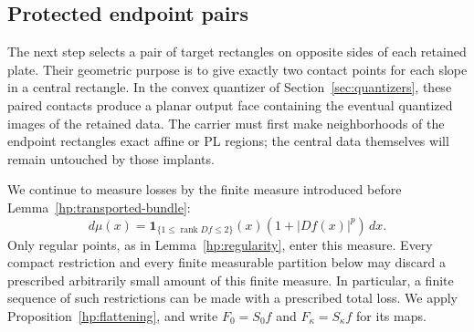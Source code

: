 \documentclass[11pt]{article}
\numberwithin{equation}{section}
\theoremstyle{definition}
\theoremstyle{remark}
\newcommand{\ind}{\mathbf 1}
\DeclareMathOperator{\rank}{rank}
\begin{document}
\subsection{Protected endpoint pairs}

The next step selects a pair of target rectangles on opposite sides of
each retained plate.  Their geometric purpose is to give exactly two
contact points for each slope in a central rectangle.  In the convex
quantizer of Section~\ref{sec:quantizers}, these paired contacts produce
a planar output face containing the eventual quantized images of the
retained data.  The carrier must
first make neighborhoods of the endpoint rectangles exact affine or
PL regions; the central data themselves will remain untouched by those
implants.

We continue to measure losses by the finite measure introduced before
Lemma~\ref{hp:transported-bundle}:
\[
 d\mu(x)=\ind_{\{1\leq\rank Df\leq2\}}(x)
             (1+|Df(x)|^p)\,dx.
\]
Only regular points, as in Lemma~\ref{hp:regularity}, enter this measure.
Every compact restriction and every finite measurable partition below may
discard a prescribed arbitrarily small amount of this finite measure.
In particular, a finite sequence of such restrictions can be made with a
prescribed total loss.  We apply Proposition~\ref{hp:flattening}, and write
$F_0=S_0f$ and $F_\kappa=S_\kappa f$ for its maps.
\end{document}
